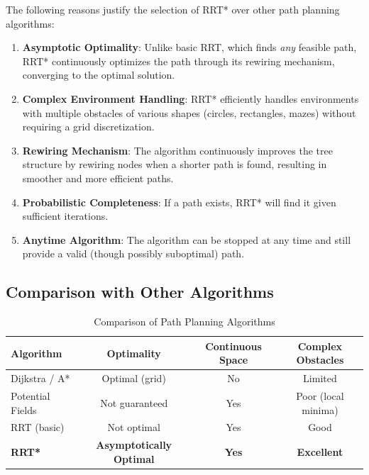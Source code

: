 \documentclass[12pt,a4paper]{scrartcl}
\begin{document}
	The following reasons justify the selection of RRT* over other path planning algorithms:
	
	\begin{enumerate}
		\item \textbf{Asymptotic Optimality}: Unlike basic RRT, which finds \textit{any} feasible path, RRT* continuously optimizes the path through its rewiring mechanism, converging to the optimal solution.
		
		\item \textbf{Complex Environment Handling}: RRT* efficiently handles environments with multiple obstacles of various shapes (circles, rectangles, mazes) without requiring a grid discretization.
		
		\item \textbf{Rewiring Mechanism}: The algorithm continuously improves the tree structure by rewiring nodes when a shorter path is found, resulting in smoother and more efficient paths.
		
		\item \textbf{Probabilistic Completeness}: If a path exists, RRT* will find it given sufficient iterations.
		
		\item \textbf{Anytime Algorithm}: The algorithm can be stopped at any time and still provide a valid (though possibly suboptimal) path.
	\end{enumerate}
	
	\subsection{Comparison with Other Algorithms}
	
	\begin{table}[htb]
		\centering
		\caption{Comparison of Path Planning Algorithms}
		\begin{tabular}{lccc}
			\toprule
			\textbf{Algorithm} & \textbf{Optimality} & \textbf{Continuous Space} & \textbf{Complex Obstacles} \\
			\midrule
			Dijkstra / A* & Optimal (grid) & No & Limited \\
			Potential Fields & Not guaranteed & Yes & Poor (local minima) \\
			RRT (basic) & Not optimal & Yes & Good \\
			\textbf{RRT*} & \textbf{Asymptotically Optimal} & \textbf{Yes} & \textbf{Excellent} \\
			\bottomrule
		\end{tabular}
		\label{tab:comparison}
	\end{table}
	
\end{document}
